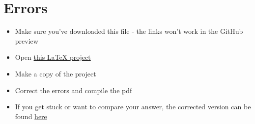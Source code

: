 \documentclass[11pt,a4paper]{article}
\begin{document}
\section{Errors}\label{sec:errors}
\begin{itemize}
\item Make sure you've downloaded this file - the links won't work in the GitHub preview
\item Open \href{https://www.overleaf.com/read/gnzphcnqgfvf}{this LaTeX project}
\item Make a copy of the project
\item Correct the errors and compile the pdf
\item If you get stuck or want to compare your answer, the corrected version can be found \href{https://www.overleaf.com/read/zsmyvxvdcvfr}{here}
\end{itemize}
\end{document}
